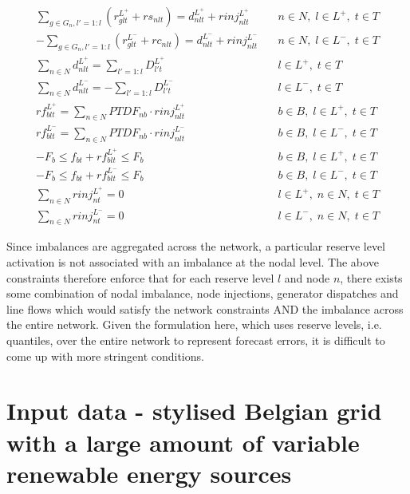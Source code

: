 \documentclass[number,times]{elsarticle}
\begin{document}
\begin{align}
    \sum_{g \in G_n, l'=1:l} (r^{L^+}_{glt} + rs_{nlt}) = d^{L^+}_{nlt} + rinj^{L^+}_{nlt}   & \quad n \in N, \; l \in L^+, \; t \in T \\
    - \sum_{g \in G_n, l'=1:l} (r^{L^-}_{glt} + rc_{nlt}) = d^{L^-}_{nlt} + rinj^{L^-}_{nlt} & \quad n \in N, \; l \in L^-, \; t \in T \\
    \sum_{n \in N} d^{L^+}_{nlt} = \sum_{l'=1:l} D^{L^+}_{l't}                               & \quad l \in L^+, \; t \in T             \\
    \sum_{n \in N} d^{L^-}_{nlt} = - \sum_{l'=1:l} D^{L^-}_{l't}                             & \quad l \in L^-, \; t \in T             \\
    rf^{L^+}_{blt} = \sum_{n \in N} PTDF_{nb} \cdot rinj^{L^+}_{nlt}                         & \quad b \in B, \; l \in L^+, \; t \in T \\
    rf^{L^-}_{blt} = \sum_{n \in N} PTDF_{nb} \cdot rinj^{L^-}_{nlt}                         & \quad b \in B, \; l \in L^-, \; t \in T \\
    -F_{b} \leq f_{bt} + rf^{L^+}_{blt} \leq F_b                                             & \quad b \in B, \; l \in L^+, \; t \in T \\
    -F_{b} \leq f_{bt} + rf^{L^-}_{blt} \leq F_b                                             & \quad b \in B, \; l \in L^-, \; t \in T \\
    \sum_{n \in N} rinj^{L^+}_{nt} = 0                                                       & \quad l \in L^+, \; n \in N, \; t \in T \\
    \sum_{n \in N} rinj^{L^-}_{nt} = 0                                                       & \quad l \in L^-, \; n \in N, \; t \in T
\end{align}

Since imbalances are aggregated across the network, a particular reserve level activation is not associated with an imbalance at the nodal level. The above constraints therefore enforce that for each reserve level $l$ and node $n$, there exists some combination of nodal imbalance, node injections, generator dispatches and line flows which would satisfy the network constraints AND the imbalance across the entire network. Given the formulation here, which uses reserve levels, i.e. quantiles, over the entire network to represent forecast errors, it is difficult to come up with more stringent conditions.

\section{Input data - stylised Belgian grid with a large amount of variable renewable energy sources}
\end{document}
